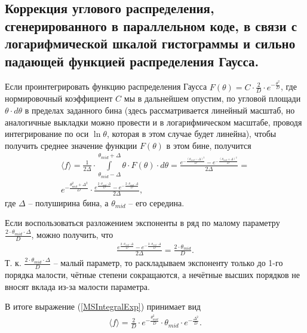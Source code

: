\documentclass[a4paper,12pt]{article}
\begin{document}
\begin{large}
\subsection{Коррекция углового распределения, сгенерированного в параллельном коде, в связи с логарифмической шкалой гистограммы и сильно падающей функцией распределения Гаусса.}
\label{subValMS4}

	Если проинтегрировать функцию распределения Гаусса $F(\theta)=C \cdot \frac{2}{D} \cdot e^{-\frac{\theta^2}{D}}$, где нормировочный коэффициент $C$ мы в дальнейшем опустим, по угловой площади $\theta \cdot d\theta$ в пределах заданного бина (здесь рассматривается линейный масштаб, но аналогичные выкладки можно провести и в логарифмическом масштабе, проводя интегрирование по оси $\ln{\theta}$, которая в этом случае будет линейна), чтобы получить среднее значение функции $F(\theta)$ в этом бине, получится
\begin{equation}
\label{MSIntegralExp}
\begin{aligned} 
  \langle f \rangle = \frac{1}{2\Delta} \cdot \int \limits_{\theta_{mid} - \Delta}^{\theta_{mid} + \Delta} \theta \cdot F(\theta) \cdot d \theta =
  \frac{e^{-\frac{\left( \theta_{mid} - \Delta \right)^2}{D}} - e^{-\frac{\left( \theta_{mid} + \Delta \right)^2}{D}}}{2\Delta} = \\
  e^{-\frac{\theta^2_{mid} + \Delta^2}{D}} \cdot \frac{ e^{\frac{2 \cdot \theta_{mid} \cdot \Delta}{D}} - e^{-\frac{2 \cdot \theta_{mid} \cdot \Delta}{D}} }{2\Delta},
\end{aligned}
\end{equation}
	где $\Delta$ -- полуширина бина, а $\theta_{mid}$ -- его середина.

	Если воспользоваться разложением экспоненты в ряд по малому параметру $\frac{2 \cdot \theta_{mid} \cdot \Delta}{D}$, можно получить, что
\begin{equation}
\label{MSIntegralExpand}
\begin{aligned} 
  \frac{ e^{\frac{2 \cdot \theta_{mid} \cdot \Delta}{D}} - e^{-\frac{2 \cdot \theta_{mid} \cdot \Delta}{D}} }{2\Delta} =
  \frac{2 \cdot \theta_{mid}}{D}.
\end{aligned}
\end{equation}
	Т. к. $\frac{2 \cdot \theta_{mid} \cdot \Delta}{D}$ -- малый параметр, то раскладываем экспоненту только до 1-го порядка малости, чётные степени сокращаются, а нечётные высших порядков не вносят вклада из-за малости параметра.

	В итоге выражение (\ref{MSIntegralExp}) принимает вид
\begin{equation}
\label{MSIntegralFin}
\begin{aligned} 
  \langle f \rangle = \frac{2}{D} \cdot e^{-\frac{\theta^2_{mid}}{D}} \cdot \theta_{mid} \cdot e^{-\frac{\Delta^2}{D}} .
\end{aligned}
\end{equation}


\end{large}
\end{document}
